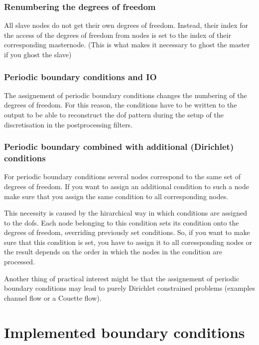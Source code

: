 \subsubsection{Renumbering the degrees of freedom}
All slave nodes do not get their own degrees of freedom. Instead, their index
for the access of the degrees of freedom from nodes is set to the index of
their corresponding masternode. (This is what makes it necessary to ghost the
master if you ghost the slave)

\subsubsection{Periodic boundary conditions and IO}
The assignement of periodic boundary conditions changes the numbering of the
degrees of freedom. For this reason, the conditions have to be written to the
output to be able to reconstruct the dof pattern during the setup of the
discretisation in the postprocessing filters.

\subsubsection{Periodic boundary combined with additional 
  (Dirichlet) conditions}
For periodic boundary conditions several nodes correspond to the same set of
degrees of freedom. If you want to assign an additional condition to such a
node make sure that you assign the same condition to all corresponding nodes.

This necessity is caused by the hirarchical way in which conditions are
assigned to the dofs. Each node belonging to this condition sets its condition
onto the degrees of freedom, overriding previously set conditions.
So, if you want to make sure that this condition is set, you have to assign it
to all coressponding nodes or the result depends on the order in which the
nodes in the condition are processed.

Another thing of practical interest might be that the assignement of periodic
boundary conditions may lead to purely Dirichlet constrained problems
(examples channel flow or a Couette flow). 

\section{Implemented boundary conditions}

